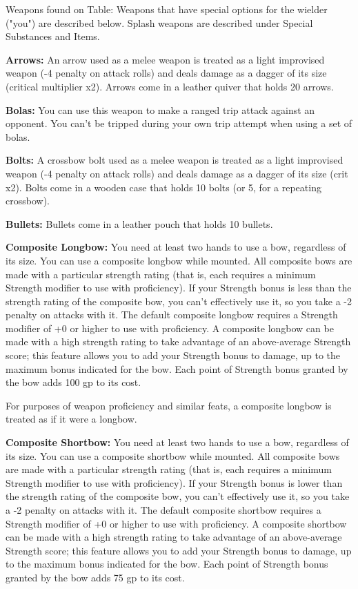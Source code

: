 \begin{multicols}{2}

Weapons found on Table: Weapons that have special options for the wielder ("you") are described below. Splash weapons are described under Special Substances and Items.

\textbf{Arrows:} An arrow used as a melee weapon is treated as a light improvised weapon (-4 penalty on attack rolls) and deals damage as a dagger of its size (critical multiplier x2). Arrows come in a leather quiver that holds 20 arrows.

\textbf{Bolas:} You can use this weapon to make a ranged trip attack against an opponent. You can't be tripped during your own trip attempt when using a set of bolas.

\textbf{Bolts:} A crossbow bolt used as a melee weapon is treated as a light improvised weapon (-4 penalty on attack rolls) and deals damage as a dagger of its size (crit x2). Bolts come in a wooden case that holds 10 bolts (or 5, for a repeating crossbow). 

\textbf{Bullets:} Bullets come in a leather pouch that holds 10 bullets.

\textbf{Composite Longbow:} You need at least two hands to use a bow, regardless of its size. You can use a composite longbow while mounted. All composite bows are made with a particular strength rating (that is, each requires a minimum Strength modifier to use with proficiency). If your Strength bonus is less than the strength rating of the composite bow, you can't effectively use it, so you take a -2 penalty on attacks with it. The default composite longbow requires a Strength modifier of +0 or higher to use with proficiency. A composite longbow can be made with a high strength rating to take advantage of an above-average Strength score; this feature allows you to add your Strength bonus to damage, up to the maximum bonus indicated for the bow. Each point of Strength bonus granted by the bow adds 100 gp to its cost.

For purposes of weapon proficiency and similar feats, a composite longbow is treated as if it were a longbow.

\textbf{Composite Shortbow:} You need at least two hands to use a bow, regardless of its size. You can use a composite shortbow while mounted. All composite bows are made with a particular strength rating (that is, each requires a minimum Strength modifier to use with proficiency). If your Strength bonus is lower than the strength rating of the composite bow, you can't effectively use it, so you take a -2 penalty on attacks with it. The default composite shortbow requires a Strength modifier of +0 or higher to use with proficiency. A composite shortbow can be made with a high strength rating to take advantage of an above-average Strength score; this feature allows you to add your Strength bonus to damage, up to the maximum bonus indicated for the bow. Each point of Strength bonus granted by the bow adds 75 gp to its cost. 


\end{multicols}

